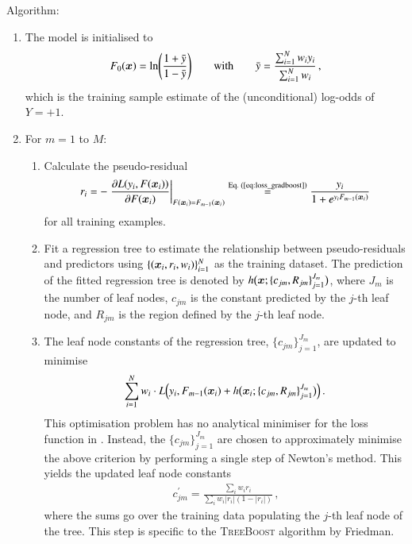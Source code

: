 \vspace{6pt}
\noindent Algorithm:
\begin{enumerate}[itemsep=2pt]

\item The model is initialised to
  \begin{align*}
    F_0(\bm{x}) = \ln\mathopen{}\left( \frac{1 + \bar{y}}{1 - \bar{y}}
    \right)\mathclose{}
    \qquad \text{with} \qquad
    \bar{y} = \frac{\sum_{i=1}^{N} w_i y_i}{\sum_{i=1}^{N} w_i} \,\text{,}
  \end{align*}
  which is the training sample estimate of the (unconditional) log-odds of
  $Y = +1$.

\item For $m = 1$ to $M$:
  \begin{enumerate}[itemsep=2pt]

  \item Calculate the pseudo-residual
    \begin{align*}
      r_i
      = - \left. \frac{\partial L(y_i, F(\bm{x}_i))}
      {\partial F(\bm{x}_i)}\right|_{F(\bm{x}_i) = F_{m - 1}(\bm{x}_i)}
      \overset{\text{Eq.\ (\ref{eq:loss_gradboost})}}{=}
      \frac{y_i}{1 + e^{y_i F_{m-1}(\bm{x}_i)}}
    \end{align*}
    for all training examples.

  \item Fit a regression tree to estimate the relationship between
    pseudo-residuals and predictors using
    $\{(\bm{x}_i, r_i, w_i)\}_{i = 1}^N$ as the training dataset. The
    prediction of the fitted regression tree is denoted by
    $h\bigl( \bm{x}; \{c_{jm}, R_{jm}\}_{j=1}^{J_{m}} \bigr)$, where $J_{m}$
    is the number of leaf nodes, $c_{jm}$ is the constant predicted by the
    $j$-th leaf node, and $R_{jm}$ is the region defined by the $j$-th leaf
    node.

  \item The leaf node constants of the regression tree,
    $\{c_{jm}\}_{j=1}^{J_{m}}$, are updated to minimise
    \begin{align*}
      \sum_{i=1}^{N} w_i \cdot
      L\mathopen{}\left( y_i, F_{m - 1}(\bm{x}_i)
      + h\bigl( \bm{x}_i; \{c_{jm}, R_{jm}\}_{j=1}^{J_{m}} \bigr)
      \right)\mathclose{}
      \,\text{.}
    \end{align*}
    This optimisation problem has no analytical minimiser for the loss function
    in . Instead, the $\{c_{jm}\}_{j=1}^{J_{m}}$ are
    chosen to approximately minimise the above criterion by performing a single
    step of Newton's method.
    This yields the updated leaf node constants
    \begin{align*}
      c_{jm}^\prime = \frac{ \sum_i w_i r_i }{ \sum_i w_i |r_i| (1 - |r_i|)} \,\text{,}
    \end{align*}
    where the sums go over the training data populating the $j$-th leaf node of
    the tree. This step is specific to the \textsc{TreeBoost} algorithm by
    Friedman.


\end{enumerate}
\end{enumerate}

